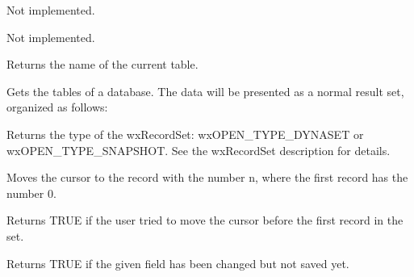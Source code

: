 
Not implemented.
  


Not implemented.



Returns the name of the current table.
  


Gets the tables of a database. The data will be presented as a normal result
set, organized as follows:

\begin{twocollist}\itemsep=0pt
\end{twocollist}



Returns the type of the wxRecordSet: wxOPEN\_TYPE\_DYNASET or
wxOPEN\_TYPE\_SNAPSHOT. See the wxRecordSet description for details.



Moves the cursor to the record with the number n, where  the first record
has the number 0.
  


Returns TRUE if the user tried to move the cursor before the first record
in the set.



Returns TRUE if the given field has been changed but not saved yet.


